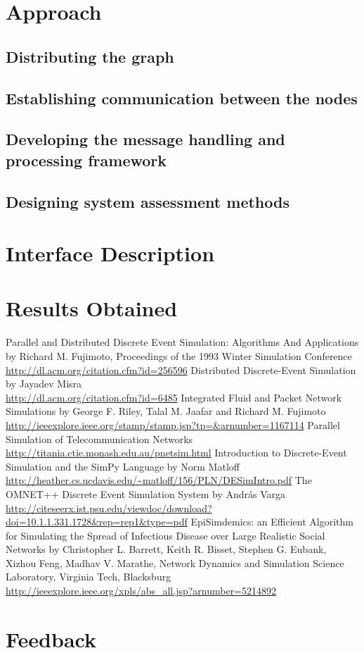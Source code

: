 \documentclass[12pt,a4paper]{article}
\begin{document}
\section{Approach}
	\subsection{Distributing the graph}
	\subsection{Establishing communication between the nodes}
	\subsection{Developing the message handling and processing framework}
	\subsection{Designing system assessment methods}
\section{Interface Description}
	 
\section{Results Obtained}

\begin{thebibliography}{99}
Parallel and Distributed Discrete Event Simulation: Algorithms And Applications by Richard M. Fujimoto, Proceedings of the 1993 Winter Simulation Conference
\\ \url{http://dl.acm.org/citation.cfm?id=256596}
Distributed Discrete-Event Simulation by Jayadev Misra
\\ \url{http://dl.acm.org/citation.cfm?id=6485}
Integrated Fluid and Packet Network Simulations by George F. Riley, Talal M. Jaafar and Richard M. Fujimoto
\\ \url{http://ieeexplore.ieee.org/stamp/stamp.jsp?tp=&arnumber=1167114}
Parallel Simulation of Telecommunication Networks \url{http://titania.ctie.monash.edu.au/pnetsim.html}
Introduction to Discrete-Event Simulation and the SimPy Language by Norm Matloff
\\ \url{http://heather.cs.ucdavis.edu/~matloff/156/PLN/DESimIntro.pdf}
The OMNET++ Discrete Event Simulation System by András Varga
\\ \url{http://citeseerx.ist.psu.edu/viewdoc/download?doi=10.1.1.331.1728&rep=rep1&type=pdf}
EpiSimdemics: an Efficient Algorithm for Simulating the Spread of Infectious Disease over Large Realistic Social Networks by Christopher L. Barrett, Keith R. Bisset, Stephen G. Eubank, Xizhou Feng, Madhav V. Marathe, Network Dynamics and Simulation Science Laboratory, Virginia Tech, Blacksburg
\\ \url{http://ieeexplore.ieee.org/xpls/abs_all.jsp?arnumber=5214892}
\end{thebibliography}

\section{Feedback}
\end{document}
